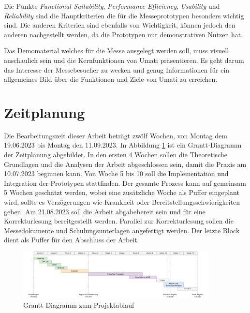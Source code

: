 \documentclass[a4paper, 12pt, oneside, toc=listofnumbered, bibliography=totoc]{scrbook}
\begin{document}
	Die Punkte \textit{Functional Suitability}, \textit{Performance Efficiency}, \textit{Usability} und \textit{Reliability} sind die Hauptkriterien die für die Messeprototypen besonders wichtig sind. Die anderen Kriterien sind ebenfalls von Wichtigkeit, können jedoch den anderen nachgestellt werden, da die Prototypen nur demonstrativen Nutzen hat. 
	
	Das Demomaterial welches für die Messe ausgelegt werden soll, muss visuell anschaulich sein und die Kernfunktionen von \ac{Umati} präsentieren. Es geht darum das Interesse der Messebesucher zu wecken und genug Informationen für ein allgemeines Bild über die Funktionen und Ziele von \ac{Umati} zu erreichen. 
	
	
	\section{Zeitplanung}
	
	Die Bearbeitungszeit dieser Arbeit beträgt zwölf Wochen, von Montag dem 19.06.2023 bis Montag den 11.09.2023. In Abbildung \ref{fig:Grantt} ist ein Grantt-Diagramm der Zeitplanung abgebildet. In den ersten 4 Wochen sollen die Theoretische Grundlagen und die Analysen der Arbeit abgeschlossen sein, damit die Praxis am 10.07.2023 beginnen kann. Von Woche 5 bis 10 soll die Implementation und Integration der Prototypen stattfinden. Der gesamte Prozess kann auf gemeinsam 5 Wochen geschätzt werden, wobei eine zusätzliche Woche als Puffer eingeplant wird, sollte es Verzögerungen wie Krankheit oder Bereitstellungsschwierigkeiten geben. Am 21.08.2023 soll die Arbeit abgabebereit sein und für eine Korrekturlesung bereitgestellt werden. Parallel zur Korrekturlesung sollen die Messedokumente und Schulungsunterlagen angefertigt werden. Der letzte Block dient als Puffer für den Abschluss der Arbeit.
	
	\begin{figure}[H]
		\centering
		\includegraphics[width=0.9\textwidth]{res/analysen/Grantt-Diagramm.pdf}
		\caption{Grantt-Diagramm zum Projektablauf}
		\label{fig:Grantt}
	\end{figure}
	
\end{document}
